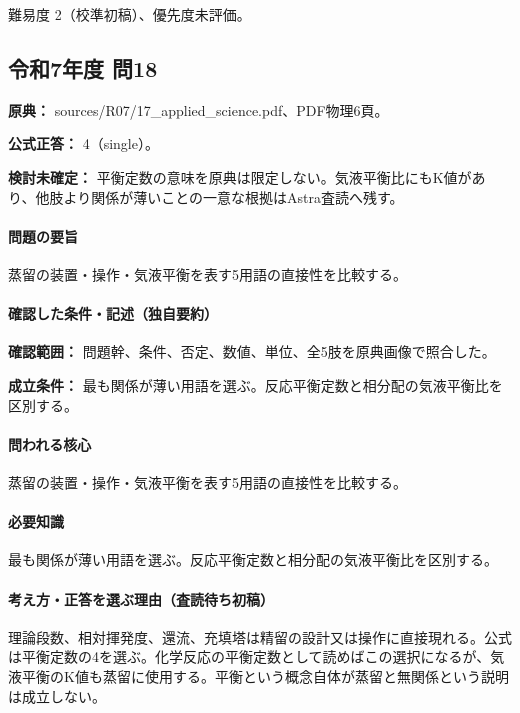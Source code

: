 \par 難易度 2（校準初稿）、優先度未評価。

\subsection{令和7年度 問18}
\label{q:r07-reg-applied-18}

\noindent\textbf{原典：} sources/R07/17\_applied\_science.pdf、PDF物理6頁。

\textbf{公式正答：} 4（single）。

\par\textbf{検討未確定：} 平衡定数の意味を原典は限定しない。気液平衡比にもK値があり、他肢より関係が薄いことの一意な根拠はAstra査読へ残す。

\paragraph{問題の要旨} 蒸留の装置・操作・気液平衡を表す5用語の直接性を比較する。

\paragraph{確認した条件・記述（独自要約）}\mbox{}\par

\noindent\textbf{確認範囲：} 問題幹、条件、否定、数値、単位、全5肢を原典画像で照合した。\par

\noindent\textbf{成立条件：} 最も関係が薄い用語を選ぶ。反応平衡定数と相分配の気液平衡比を区別する。\par

\paragraph{問われる核心} 蒸留の装置・操作・気液平衡を表す5用語の直接性を比較する。

\paragraph{必要知識} 最も関係が薄い用語を選ぶ。反応平衡定数と相分配の気液平衡比を区別する。

\paragraph{考え方・正答を選ぶ理由（査読待ち初稿）} 理論段数、相対揮発度、還流、充填塔は精留の設計又は操作に直接現れる。公式は平衡定数の4を選ぶ。化学反応の平衡定数として読めばこの選択になるが、気液平衡のK値も蒸留に使用する。平衡という概念自体が蒸留と無関係という説明は成立しない。

